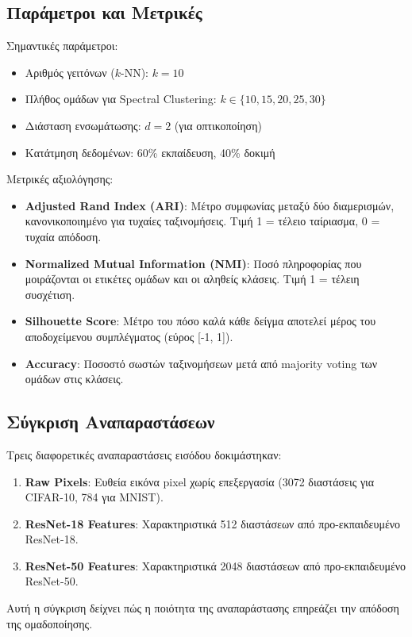 \documentclass[a4paper,11pt]{article}
\newcommand{\lt}[1]{\foreignlanguage{english}{#1}}
\begin{document}
\subsection{Παράμετροι και Μετρικές}
Σημαντικές παράμετροι:
\begin{itemize}
  \item Αριθμός γειτόνων ($k$-NN): $k = 10$
  \item Πλήθος ομάδων για \lt{Spectral Clustering}: $k \in \{10, 15, 20, 25, 30\}$
  \item Διάσταση ενσωμάτωσης: $d = 2$ (για οπτικοποίηση)
  \item Κατάτμηση δεδομένων: 60\% εκπαίδευση, 40\% δοκιμή
\end{itemize}

Μετρικές αξιολόγησης:
\begin{itemize}
  \item \textbf{\lt{Adjusted Rand Index (ARI)}}: Μέτρο συμφωνίας μεταξύ δύο διαμερισμών, κανονικοποιημένο για τυχαίες ταξινομήσεις. Τιμή 1 = τέλειο ταίριασμα, 0 = τυχαία απόδοση.
  \item \textbf{\lt{Normalized Mutual Information (NMI)}}: Ποσό πληροφορίας που μοιράζονται οι ετικέτες ομάδων και οι αληθείς κλάσεις. Τιμή 1 = τέλειη συσχέτιση.
  \item \textbf{\lt{Silhouette Score}}: Μέτρο του πόσο καλά κάθε δείγμα αποτελεί μέρος του αποδοχείμενου συμπλέγματος (εύρος [-1, 1]).
  \item \textbf{\lt{Accuracy}}: Ποσοστό σωστών ταξινομήσεων μετά από \lt{majority voting} των ομάδων στις κλάσεις.
\end{itemize}

\subsection{Σύγκριση Αναπαραστάσεων}
Τρεις διαφορετικές αναπαραστάσεις εισόδου δοκιμάστηκαν:
\begin{enumerate}
  \item \textbf{Raw Pixels}: Ευθεία εικόνα pixel χωρίς επεξεργασία (3072 διαστάσεις για \lt{CIFAR-10}, 784 για \lt{MNIST}).
  \item \textbf{\lt{ResNet-18 Features}}: Χαρακτηριστικά 512 διαστάσεων από προ-εκπαιδευμένο \lt{ResNet-18}.
  \item \textbf{\lt{ResNet-50 Features}}: Χαρακτηριστικά 2048 διαστάσεων από προ-εκπαιδευμένο \lt{ResNet-50}.
\end{enumerate}
Αυτή η σύγκριση δείχνει πώς η ποιότητα της αναπαράστασης επηρεάζει την απόδοση της ομαδοποίησης.
\end{document}
